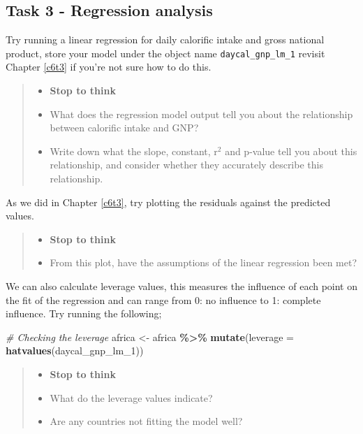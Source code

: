 \documentclass[
]{book}
\newenvironment{Shaded}{\begin{snugshade}}{\end{snugshade}}
\newcommand{\AttributeTok}[1]{\textcolor[rgb]{0.13,0.29,0.53}{#1}}
\newcommand{\CommentTok}[1]{\textcolor[rgb]{0.56,0.35,0.01}{\textit{#1}}}
\newcommand{\FunctionTok}[1]{\textcolor[rgb]{0.13,0.29,0.53}{\textbf{#1}}}
\newcommand{\NormalTok}[1]{#1}
\newcommand{\OtherTok}[1]{\textcolor[rgb]{0.56,0.35,0.01}{#1}}
\newcommand{\SpecialCharTok}[1]{\textcolor[rgb]{0.81,0.36,0.00}{\textbf{#1}}}
\providecommand{\tightlist}{%
  \setlength{\itemsep}{0pt}\setlength{\parskip}{0pt}}
\begin{document}
\subsection{Task 3 - Regression analysis}\label{task-3---regression-analysis}

Try running a linear regression for daily calorific intake and gross national product, store your model under the object name \texttt{daycal\_gnp\_lm\_1} revisit Chapter \ref{c6t3} if you're not sure how to do this.

\begin{quote}
\begin{itemize}
\tightlist
\item
  \textbf{Stop to think}
\item
  What does the regression model output tell you about the relationship between calorific intake and GNP?
\item
  Write down what the slope, constant, r\(^2\) and p-value tell you about this relationship, and consider whether they accurately describe this relationship.
\end{itemize}
\end{quote}

As we did in Chapter \ref{c6t3}, try plotting the residuals against the predicted values.

\begin{quote}
\begin{itemize}
\tightlist
\item
  \textbf{Stop to think}
\item
  From this plot, have the assumptions of the linear regression been met?
\end{itemize}
\end{quote}

We can also calculate leverage values, this measures the influence of each point on the fit of the regression and can range from 0: no influence to 1: complete influence. Try running the following;

\begin{Shaded}
\begin{Highlighting}[]
\CommentTok{\# Checking the leverage }
\NormalTok{africa }\OtherTok{\textless{}{-}}\NormalTok{ africa }\SpecialCharTok{\%\textgreater{}\%}
  \FunctionTok{mutate}\NormalTok{(}\AttributeTok{leverage =} \FunctionTok{hatvalues}\NormalTok{(daycal\_gnp\_lm\_1))}
\end{Highlighting}
\end{Shaded}

\begin{quote}
\begin{itemize}
\tightlist
\item
  \textbf{Stop to think}
\item
  What do the leverage values indicate?
\item
  Are any countries not fitting the model well?
\end{itemize}
\end{quote}
\end{document}
